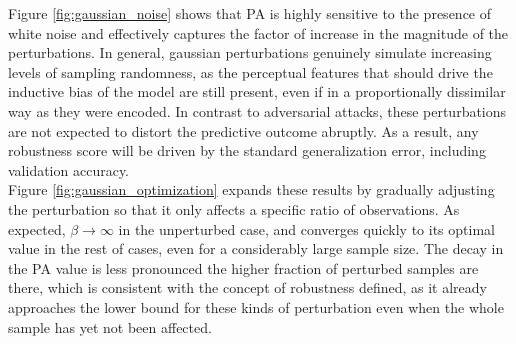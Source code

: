 Figure \ref{fig:gaussian_noise} shows that 
PA is highly sensitive to the presence of white noise and effectively captures the factor 
of increase in the magnitude of the perturbations. In general, gaussian perturbations genuinely simulate increasing levels of sampling randomness, as the 
perceptual features that should drive the inductive bias of the model are still present, even 
if in a proportionally dissimilar way as they were encoded. In contrast to adversarial attacks, 
these perturbations are not expected to distort the predictive outcome 
abruptly. As a result, any robustness score will be driven by the standard generalization error, including validation 
accuracy. \\

Figure \ref{fig:gaussian_optimization} expands these results by gradually adjusting
the perturbation so that it only affects a specific ratio of observations. As expected, 
$\beta \longrightarrow \infty$ in the unperturbed case, and converges
quickly to its optimal value in the rest of cases, even for a considerably large 
sample size. The decay in the PA value is less pronounced the higher
fraction of perturbed samples are there, which is consistent with the concept 
of robustness defined, as it already approaches the lower bound for these kinds of 
perturbation even when the whole sample has yet not been affected. \\


